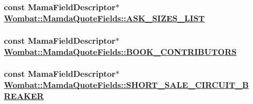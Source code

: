 \hypertarget{classWombat_1_1MamdaQuoteFields_3afeb45bd724abdd29aeee21c30b7c4f}{
\subsubsection[ASK\_\-SIZES\_\-LIST]{\setlength{\rightskip}{0pt plus 5cm}const Mama\-Field\-Descriptor$\ast$ \hyperlink{classWombat_1_1MamdaQuoteFields_3afeb45bd724abdd29aeee21c30b7c4f}{Wombat::Mamda\-Quote\-Fields::ASK\_\-SIZES\_\-LIST}}}
\label{classWombat_1_1MamdaQuoteFields_3afeb45bd724abdd29aeee21c30b7c4f}


\hypertarget{classWombat_1_1MamdaQuoteFields_1fd00e0abec6f595e2139efa75ca9556}{
\subsubsection[BOOK\_\-CONTRIBUTORS]{\setlength{\rightskip}{0pt plus 5cm}const Mama\-Field\-Descriptor$\ast$ \hyperlink{classWombat_1_1MamdaQuoteFields_1fd00e0abec6f595e2139efa75ca9556}{Wombat::Mamda\-Quote\-Fields::BOOK\_\-CONTRIBUTORS}}}
\label{classWombat_1_1MamdaQuoteFields_1fd00e0abec6f595e2139efa75ca9556}


\hypertarget{classWombat_1_1MamdaQuoteFields_509b04d7924b4417eceb403ac34fcc57}{
\subsubsection[SHORT\_\-SALE\_\-CIRCUIT\_\-BREAKER]{\setlength{\rightskip}{0pt plus 5cm}const Mama\-Field\-Descriptor$\ast$ \hyperlink{classWombat_1_1MamdaQuoteFields_509b04d7924b4417eceb403ac34fcc57}{Wombat::Mamda\-Quote\-Fields::SHORT\_\-SALE\_\-CIRCUIT\_\-BREAKER}}}
\label{classWombat_1_1MamdaQuoteFields_509b04d7924b4417eceb403ac34fcc57}


